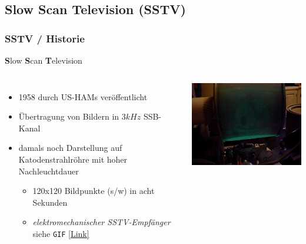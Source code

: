 \subsection[SSTV]{Slow Scan Television (SSTV)}

\begin{frame}
    \frametitle{SSTV / Historie}

    \textbf{S}low \textbf{S}can \textbf{T}elevision\\[1.5em]

    \begin{columns}[c]
        \column[c]{7cm}
        \begin{itemize}
            \item 1958 durch US-HAMs veröffentlicht
            \item Übertragung von Bildern in $3 kHz$ SSB-Kanal
            \item damals noch Darstellung auf Katodenstrahlröhre mit hoher Nachleuchtdauer
            \begin{itemize}
                \item 120x120 Bildpunkte (s/w) in acht Sekunden
                \item \emph{elektromechanischer SSTV-Empfänger} siehe \texttt{GIF}
                      \href{https://upload.wikimedia.org/wikipedia/commons/1/1e/Mechanical_glow_drum_slow_scan_television_monitor.gif}{[Link]}
            \end{itemize}
        \end{itemize}
        \column{6cm}
        \begin{center}
            \includegraphics[width=.9\textwidth]{e16/Mechanical_glow_drum_slow_scan_television_monitor.jpg}
            \tiny \hyperlink{refs}{\cite{wc}}
        \end{center}
    \end{columns}

\end{frame}


